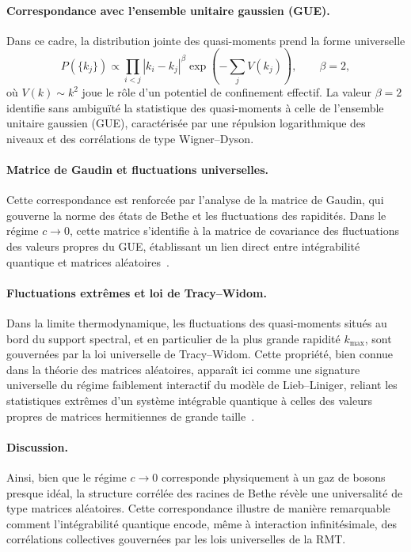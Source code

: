 \paragraph{Correspondance avec l’ensemble unitaire gaussien (GUE).}
Dans ce cadre, la distribution jointe des quasi-moments prend la forme universelle
\begin{equation}
P(\{k_j\}) \propto
\prod_{i<j} |k_i-k_j|^\beta
\exp\!\left(-\sum_{j} V(k_j)\right),
\qquad
\beta=2,
\end{equation}
où $V(k)\sim k^2$ joue le rôle d’un potentiel de confinement effectif.  
La valeur $\beta=2$ identifie sans ambiguïté la statistique des quasi-moments à celle de l’ensemble unitaire gaussien (GUE), caractérisée par une répulsion logarithmique des niveaux et des corrélations de type Wigner--Dyson.

\paragraph{Matrice de Gaudin et fluctuations universelles.}
Cette correspondance est renforcée par l’analyse de la matrice de Gaudin, qui gouverne la norme des états de Bethe et les fluctuations des rapidités.  
Dans le régime $c\to 0$, cette matrice s’identifie à la matrice de covariance des fluctuations des valeurs propres du GUE, établissant un lien direct entre intégrabilité quantique et matrices aléatoires~\cite{Gaudin1983,Forrester2010}.

\paragraph{Fluctuations extrêmes et loi de Tracy--Widom.}
Dans la limite thermodynamique, les fluctuations des quasi-moments situés au bord du support spectral, et en particulier de la plus grande rapidité $k_{\max}$, sont gouvernées par la loi universelle de Tracy--Widom.  
Cette propriété, bien connue dans la théorie des matrices aléatoires, apparaît ici comme une signature universelle du régime faiblement interactif du modèle de Lieb--Liniger, reliant les statistiques extrêmes d’un système intégrable quantique à celles des valeurs propres de matrices hermitiennes de grande taille~\cite{DeanMajumdar2006,Schehr2013}.

\paragraph{Discussion.}
Ainsi, bien que le régime $c\to 0$ corresponde physiquement à un gaz de bosons presque idéal, la structure corrélée des racines de Bethe révèle une universalité de type matrices aléatoires.  
Cette correspondance illustre de manière remarquable comment l’intégrabilité quantique encode, même à interaction infinitésimale, des corrélations collectives gouvernées par les lois universelles de la RMT.



